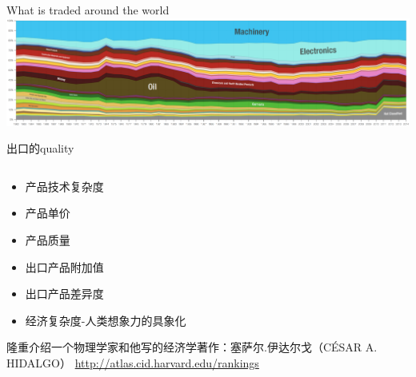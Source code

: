 \documentclass[10pt,hyperref={CJKbookmarks=true},xcolor=dvipsnames,aspectratio=169]{beamer}
\begin{document}
\begin{frame}{What is traded around the world}
\centering	\includegraphics[scale=0.22]{fig/gravity/OEC_Trade_Products}
\end{frame}

\begin{frame}{出口的quality}
  \begin{columns}[onlytextwidth]
  	\begin{column}{0.6\textwidth}
  		\begin{itemize}
  			\item 产品技术复杂度
  			\item 产品单价
  			\item 产品质量
  			\item 出口产品附加值
  			\item 出口产品差异度
  			\item 经济复杂度-人类想象力的具象化
  		\end{itemize}
  	 	隆重介绍一个物理学家和他写的经济学著作：塞萨尔.伊达尔戈（CÉSAR A. HIDALGO）
  	 	\url{http://atlas.cid.harvard.edu/rankings}
   	\end{column}
   

\end{columns}
\end{frame}
\end{document}
